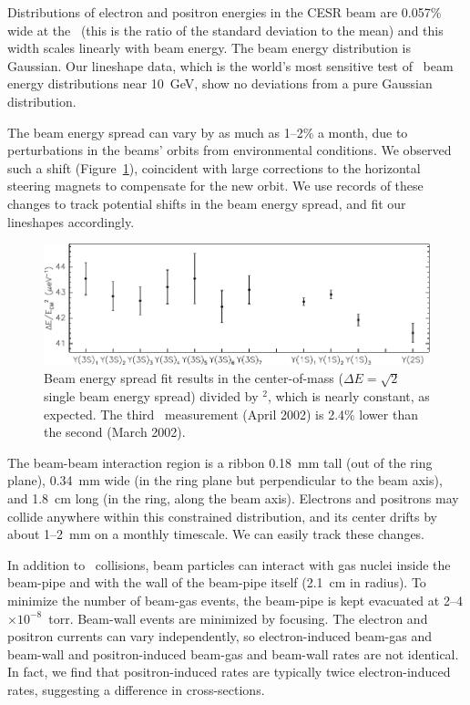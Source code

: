 \documentclass{cornell}
\begin{document}
Distributions of electron and positron energies in the CESR beam are
0.057\% wide at the \us\ (this is the ratio of the standard deviation
to the mean) and this width scales linearly with beam energy.  The
beam energy distribution is Gaussian.  Our lineshape data, which is
the world's most sensitive test of \ee\ beam energy distributions near
10~GeV, show no deviations from a pure Gaussian distribution.

The beam energy spread can vary by as much as 1--2\% a month, due to
perturbations in the beams' orbits from environmental conditions.  We
observed such a shift (Figure~\ref{beamenergyspread}), coincident with
large corrections to the horizontal steering magnets to compensate for
the new orbit.  We use records of these changes to track potential
shifts in the beam energy spread, and fit our lineshapes
accordingly. \label{pag:beamenergyspread}

\begin{figure}[p]
  \begin{center}
    \includegraphics[width=\linewidth]{plots/beamenergyspread}
  \end{center}
  \caption{\label{beamenergyspread} Beam energy spread fit results in
  the center-of-mass ($\Delta E = \sqrt{2}$ single beam energy spread)
  divided by \ecm$^2$, which is nearly constant, as expected.  The
  third \us\ measurement (April 2002) is 2.4\% lower than the second
  (March 2002).}
\end{figure}

The beam-beam interaction region is a ribbon 0.18~mm tall (out of
the ring plane), 0.34~mm wide (in the ring plane but perpendicular to
the beam axis), and 1.8~cm long (in the ring, along the beam axis).
Electrons and positrons may collide anywhere within this constrained
distribution, and its center drifts by about 1--2~mm on a monthly
timescale.  We can easily track these changes.

In addition to \ee\ collisions, beam particles can interact with gas
nuclei inside the beam-pipe and with the wall of the beam-pipe itself
(2.1~cm in radius).  To minimize the number of beam-gas events, the
beam-pipe is kept evacuated at 2--4$\times 10^{-8}$~torr.  Beam-wall
events are minimized by focusing.  The electron and positron currents
can vary independently, so electron-induced beam-gas and beam-wall and
positron-induced beam-gas and beam-wall rates are not identical.  In
fact, we find that positron-induced rates are typically twice
electron-induced rates, suggesting a difference in cross-sections.
\end{document}
